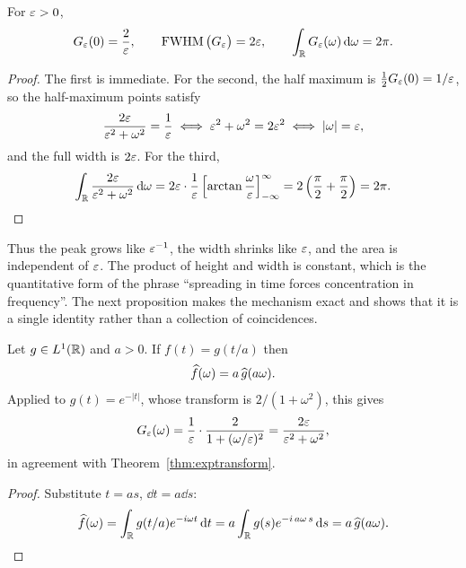 \begin{proposition}\label{prop:three}
For $\varepsilon>0$,
\begin{equation}
G_{\varepsilon}(0)=\frac{2}{\varepsilon},
\qquad
\operatorname{FWHM}\big(G_{\varepsilon}\big)=2\varepsilon,
\qquad
\int_{\mathbb{R}}G_{\varepsilon}(\omega)\,\mathrm{d}\omega=2\pi .
\label{eq:three}
\end{equation}
\end{proposition}

\begin{proof}
The first is immediate. For the second, the half maximum is $\tfrac12 G_{\varepsilon}(0)=1/\varepsilon$, so the
half-maximum points satisfy
\begin{equation}
\frac{2\varepsilon}{\varepsilon^{2}+\omega^{2}}=\frac{1}{\varepsilon}
\iff \varepsilon^{2}+\omega^{2}=2\varepsilon^{2}
\iff |\omega|=\varepsilon ,
\end{equation}
and the full width is $2\varepsilon$. For the third,
\begin{equation}
\int_{\mathbb{R}}\frac{2\varepsilon}{\varepsilon^{2}+\omega^{2}}\,\mathrm{d}\omega
=2\varepsilon\cdot\frac{1}{\varepsilon}\left[\arctan\frac{\omega}{\varepsilon}\right]_{-\infty}^{\infty}
=2\left(\frac{\pi}{2}+\frac{\pi}{2}\right)=2\pi . \qedhere
\end{equation}
\end{proof}

Thus the peak grows like $\varepsilon^{-1}$, the width shrinks like $\varepsilon$, and the area is independent of
$\varepsilon$. The product of height and width is constant, which is the quantitative form of the phrase
``spreading in time forces concentration in frequency''. The next proposition makes the mechanism
exact and shows that it is a single identity rather than a collection of coincidences.

\begin{proposition}[dilation]\label{prop:dilation}
Let $g\in L^{1}(\mathbb{R})$ and $a>0$. If $f(t)=g(t/a)$ then
\begin{equation}
\widehat{f}(\omega)=a\,\widehat{g}(a\omega).
\label{eq:dilate}
\end{equation}
Applied to $g(t)=e^{-|t|}$, whose transform is $2/(1+\omega^{2})$, this gives
\begin{equation}
G_{\varepsilon}(\omega)=\frac{1}{\varepsilon}\cdot\frac{2}{1+(\omega/\varepsilon)^{2}}
=\frac{2\varepsilon}{\varepsilon^{2}+\omega^{2}},
\end{equation}
in agreement with Theorem~\ref{thm:exptransform}.
\end{proposition}

\begin{proof}
Substitute $t=as$, $\dd t=a\dd s$:
\begin{equation}
\widehat{f}(\omega)=\int_{\mathbb{R}}g(t/a)e^{-i\omega t}\,\mathrm{d} t
=a\int_{\mathbb{R}}g(s)e^{-i\,a\omega\,s}\,\mathrm{d} s=a\,\widehat{g}(a\omega). \qedhere
\end{equation}
\end{proof}


